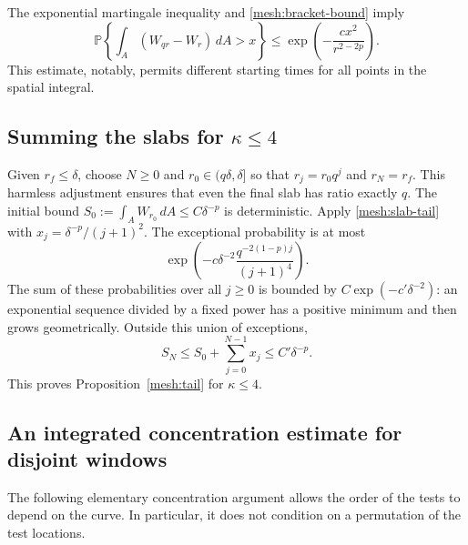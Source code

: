 The exponential martingale inequality and
\eqref{mesh:bracket-bound} imply
\begin{equation}
 \mathbb P\left\{\int_A(W_{qr}-W_r)\,dA>x\right\}
 \le\exp\left(-\frac{c x^2}{r^{2-2p}}\right).
 \label{mesh:slab-tail}
\end{equation}
This estimate, notably, permits different starting times for all
points in the spatial integral.

\subsection{Summing the slabs for
\texorpdfstring{$\kappa\le4$}{kappa at most four}}

Given $r_f\le\delta$, choose $N\ge0$ and
$r_0\in(q\delta,\delta]$ so that $r_j=r_0q^j$ and $r_N=r_f$.
This harmless adjustment ensures that even the final slab has ratio
exactly $q$.  The initial bound
$S_0:=\int_AW_{r_0}\,dA\le C\delta^{-p}$ is deterministic.
Apply \eqref{mesh:slab-tail} with
$x_j=\delta^{-p}/(j+1)^2$.  The exceptional probability is at most
\[
 \exp\left(-c\delta^{-2}
       \frac{q^{-2(1-p)j}}{(j+1)^4}\right).
\]
The sum of these probabilities over all $j\ge0$ is bounded by
$C\exp(-c'\delta^{-2})$: an exponential sequence divided by a fixed
power has a positive minimum and then grows geometrically.  Outside
this union of exceptions,
\[
 S_N\le S_0+\sum_{j=0}^{N-1}x_j\le C'\delta^{-p}.
\]
This proves Proposition~\ref{mesh:tail} for $\kappa\le4$.


\subsection{An integrated concentration estimate for disjoint windows}

The following elementary concentration argument allows the order of the
tests to depend on the curve.  In particular, it does not condition on a
permutation of the test locations.

